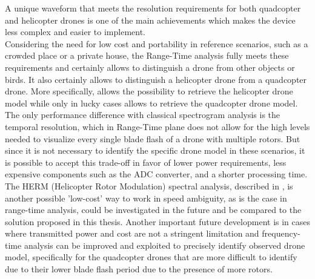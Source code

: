 A unique waveform that meets the resolution requirements for both quadcopter and helicopter drones is one of the main achievements which makes the device less complex and easier to implement.\\ Considering the need for low cost and portability in reference scenarios, such as a crowded place or a private house, the Range-Time analysis fully meets these requirements and certainly allows to distinguish a drone from other objects or birds. It also certainly allows to distinguish a helicopter drone from a quadcopter drone. More specifically, allows the possibility to retrieve the helicopter drone model while only in lucky cases allows to retrieve the quadcopter drone model. The only performance difference with classical spectrogram analysis is the temporal resolution, which in Range-Time plane does not allow for the high levels needed to visualize every single blade flash of a drone with multiple rotors. But since it is not necessary to identify the specific drone model in these scenarios, it is possible to accept this trade-off in favor of lower power requirements, less expensive components such as the ADC converter, and a shorter processing time.\\
The HERM (Helicopter Rotor Modulation) spectral analysis, described in \cite{HERM}, is another possible 'low-cost' way to work in speed ambiguity, as is the case in range-time analysis, could be investigated in the future and be compared to the solution proposed in this thesis. 
Another important future development is in cases where transmitted power and cost are not a stringent limitation and frequency-time analysis can be improved and exploited to precisely identify observed drone model, specifically for the quadcopter drones that are more difficult to identify due to their lower blade flash period due to the presence of more rotors.
